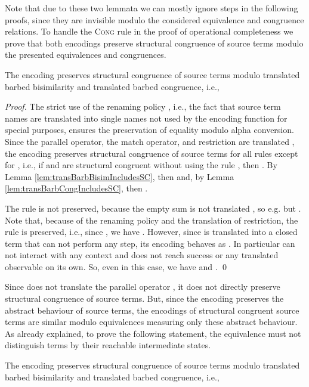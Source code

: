 \documentclass[]{llncs}
\begin{document}
Note that due to these two lemmata we can mostly ignore \pure \admin steps in the following proofs, since they are invisible modulo the considered equivalence and congruence relations. To handle the \textsc{Cong} rule in the proof of operational completeness we prove that both encodings preserve structural congruence of source terms modulo the presented equivalences and congruences.

\begin{lemma} \label{lem:preservesSCModuloTransBarbBisimSepAsyn}
	The encoding  preserves structural congruence of source terms modulo translated barbed bisimilarity and translated barbed congruence, i.e.,
	
\end{lemma}

\begin{proof}
	The strict use of the renaming policy , i.e., the fact that source term names are translated into single names not used by the encoding function for special purposes, ensures the preservation of equality modulo alpha conversion. Since the parallel operator, the match operator, and restriction are translated \cleanly, the encoding  preserves structural congruence of source terms for all rules except for , i.e., if  and  are structural congruent without using the rule , then . By Lemma \ref{lem:transBarbBisimIncludesSC}, then  and, by Lemma \ref{lem:transBarbCongIncludesSC}, then .
	
	The rule  is not preserved, because the empty sum  is not translated \cleanly, so e.g.  but . Note that, because of the renaming policy  and the \clean translation of restriction, the rule  is preserved, i.e., since , we have . However, since  is translated into a closed term that can not perform any step, its encoding behaves as . In particular  can not interact with any context and does not reach success or any translated observable on its own. So, even in this case, we have  and .
	\qed
\end{proof}

Since  does not translate the parallel operator \cleanly, it does not directly preserve structural congruence of source terms. But, since the encoding preserves the abstract behaviour of source terms, the encodings of structural congruent source terms are similar modulo equivalences measuring only these abstract behaviour. As already explained, to prove the following statement, the equivalence must not distinguish terms by their reachable intermediate states.

\begin{lemma} \label{lem:preservesSCModuloTransBarbBisimMixAsyn}
	The encoding  preserves structural congruence of source terms modulo translated barbed bisimilarity and translated barbed congruence, i.e.,
	
\end{lemma}
\end{document}
